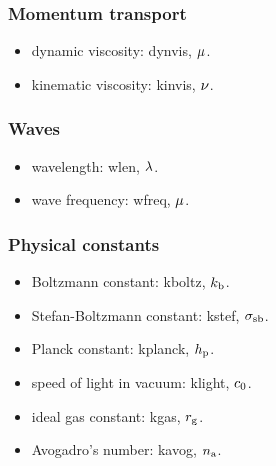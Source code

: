 \subsubsection{Momentum transport}
\begin{itemize}
\item dynamic viscosity: dynvis, $\mu$.
\item kinematic viscosity: kinvis, $\nu$.
\end{itemize}


\subsubsection{Waves}
\begin{itemize}
\item wavelength: wlen, $\lambda$.
\item wave frequency: wfreq, $\mu$.
\end{itemize}


\subsubsection{Physical constants}
\begin{itemize}
\item Boltzmann constant: kboltz, $k_\text{b}$.
\item Stefan-Boltzmann constant: kstef, $\sigma_\text{sb}$.
\item Planck constant: kplanck, $h_\text{p}$.
\item speed of light in vacuum: klight, $c_0$.
\item ideal gas constant: kgas, $r_\text{g}$.
\item Avogadro's number: kavog, $n_\text{a}$.
\end{itemize}


